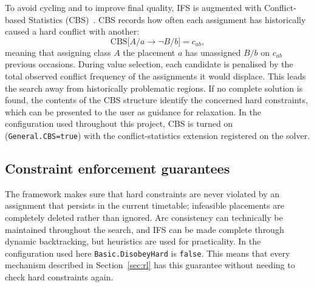 To avoid cycling and to improve final quality, IFS is augmented with Conflict-based Statistics
(CBS)~\cite{muller2004}. CBS records how often each assignment has historically caused a hard
conflict with another:
\[
  \mathrm{CBS}\bigl[A/a \rightarrow \lnot B/b\bigr] = c_{ab},
\]
meaning that assigning class $A$ the placement $a$ has unassigned $B/b$ on $c_{ab}$ previous
occasions. During value selection, each candidate is penalised by the total observed conflict
frequency of the assignments it would displace. This leads the search away from historically
problematic regions. If no complete solution is found, the contents of the CBS structure identify
the concerned hard constraints, which can be presented to the user as
guidance for relaxation. In the configuration used throughout this project, CBS is turned on
(\texttt{General.CBS=true}) with the conflict-statistics extension registered on the solver.

\subsection{Constraint enforcement guarantees}

The framework makes sure that hard constraints are never violated by an assignment that
persists in the current timetable; infeasible placements are completely deleted rather than ignored. Arc
consistency can technically be maintained throughout the search, and IFS can be made complete
through dynamic backtracking, but heuristics are used for practicality. In the configuration used here
\texttt{Basic.DisobeyHard} is \texttt{false}. This means that every mechanism described in
Section~\ref{sec:rl} has this guarantee without needing to check hard constraints again.
